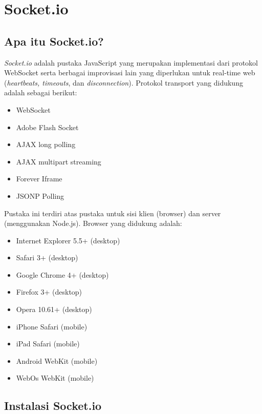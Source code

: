 \section{Socket.io}

\subsection{Apa itu Socket.io?}

\textit{Socket.io} adalah pustaka JavaScript yang merupakan implementasi dari protokol WebSocket serta berbagai improvisasi lain yang diperlukan untuk real-time web (\textit{heartbeats, timeouts}, dan \textit{disconnection}). Protokol transport yang didukung adalah sebagai berikut:
\begin{itemize}
\item WebSocket
\item Adobe Flash Socket
\item AJAX long polling
\item AJAX multipart streaming
\item Forever Iframe
\item JSONP Polling
\end{itemize}
Pustaka ini terdiri atas pustaka untuk sisi klien (browser) dan server (menggunakan Node.js). Browser yang didukung adalah:
\begin{itemize}
\item Internet Explorer 5.5+ (desktop)
\item Safari 3+ (desktop)
\item Google Chrome 4+ (desktop)
\item Firefox 3+ (desktop)
\item Opera 10.61+ (desktop)
\item iPhone Safari (mobile)
\item iPad Safari (mobile)
\item Android WebKit (mobile)
\item WebOs WebKit (mobile)
\end{itemize}

\subsection{Instalasi Socket.io}

